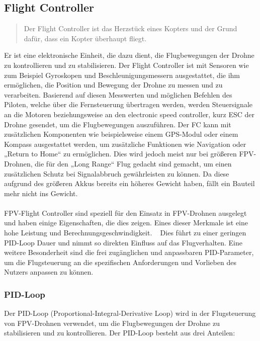     \subsection[Flight Controller]{Flight Controller}
        \begin{quote}
            \glqq Der Flight Controller ist das Herzstück eines Kopters und der Grund dafür, dass ein Kopter
            überhaupt fliegt.\grqq~\cite{FCZitat}
        \end{quote}
        Er ist eine elektronische Einheit, die dazu dient, die Flugbewegungen der
        Drohne zu kontrollieren und zu stabilisieren. Der Flight Controller ist mit Sensoren wie zum
        Beispiel Gyroskopen und Beschleunigungsmessern ausgestattet, die ihm ermöglichen, die Position
        und Bewegung der Drohne zu messen und zu verarbeiten. Basierend auf diesen Messwerten und möglichen
        Befehlen des Piloten, welche über die Fernsteuerung übertragen werden, werden Steuersignale an
        die Motoren beziehungsweise an den electronic speed controller, kurz ESC der Drohne gesendet,
        um die Flugbewegungen auszuführen. Der FC kann mit zusätzlichen Komponenten wie beispielsweise
        einem GPS-Modul oder einem Kompass ausgestattet werden, um zusätzliche Funktionen wie Navigation
        oder „Return to Home“ zu ermöglichen. Dies wird jedoch meist nur bei größeren FPV-Drohnen, die
        für den „Long Range“ Flug gedacht sind gemacht, um einen zusätzlichen Schutz bei Signalabbruch
        gewährleisten zu können. Da diese aufgrund des größeren Akkus bereits ein höheres Gewicht haben,
        fällt ein Bauteil mehr nicht ins Gewicht. \\
        \\
        FPV-Flight Controller sind speziell für den Einsatz in FPV-Drohnen ausgelegt und haben einige
        Eigenschaften, die dies zeigen. Eines dieser Merkmale ist eine hohe Leistung und Berechnungsgeschwindigkeit.
        ~\cite{CPUDatenblatt} Dies führt zu einer geringen PID-Loop Dauer und nimmt so direkten Einfluss auf das
        Flugverhalten. Eine weitere Besonderheit sind die frei zugänglichen und anpassbaren PID-Parameter, um die
        Flugsteuerung an die spezifischen Anforderungen und Vorlieben des Nutzers anpassen zu können.
    
        \subsubsection[PID-Loop]{PID-Loop}
            Der PID-Loop (Proportional-Integral-Derivative Loop) wird in der Flugsteuerung von FPV-Drohnen verwendet, um die
            Flugbewegungen der Drohne zu stabilisieren und zu kontrollieren. Der PID-Loop besteht aus drei Anteilen:

